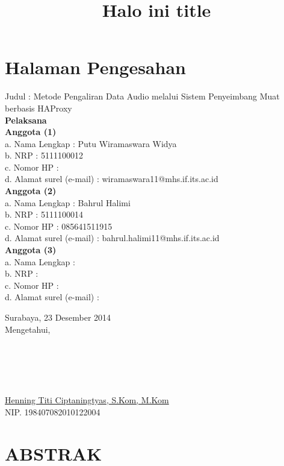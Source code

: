 \documentclass[oneside]{book}
\begin{document}
\frontmatter
	\title{Halo ini title}
	\maketitle
	

	\chapter{Halaman Pengesahan}
	Judul \tabto{4cm} : Metode Pengaliran Data Audio melalui Sistem Penyeimbang Muat berbasis HAProxy 
	\\
	\textbf{Pelaksana} \\
	\textbf{Anggota (1)} \\
	a. Nama Lengkap \tabto*{4cm} : Putu Wiramaswara Widya\\
	b. NRP \tabto*{4cm} : 5111100012\\
	c. Nomor HP \tabto*{4cm} : \\
	d. Alamat surel (e-mail) \tabto*{4cm} : wiramaswara11@mhs.if.its.ac.id\\
	\textbf{Anggota (2)} \\
	a. Nama Lengkap \tabto*{4cm} : Bahrul Halimi\\
	b. NRP \tabto*{4cm} : 5111100014\\
	c. Nomor HP \tabto*{4cm} : 085641511915\\
	d. Alamat surel (e-mail) \tabto*{4cm} : bahrul.halimi11@mhs.if.its.ac.id\\
	\textbf{Anggota (3)} \\
	a. Nama Lengkap \tabto*{4cm} : \\
	b. NRP \tabto*{4cm} : \\
	c. Nomor HP \tabto*{4cm} : \\
	d. Alamat surel (e-mail) \tabto*{4cm} : \\
	
	\begin{center}
		Surabaya, 23 Desember 2014 \\
		Mengetahui,	\\
		\ \\
		\ \\
		\ \\
		\ \\
		\ \\
		\underline{Henning Titi Ciptaningtyas, S.Kom, M.Kom} \\
		NIP. 198407082010122004
	\end{center}
	
	
	

	\chapter{ABSTRAK}
	
\end{document}
